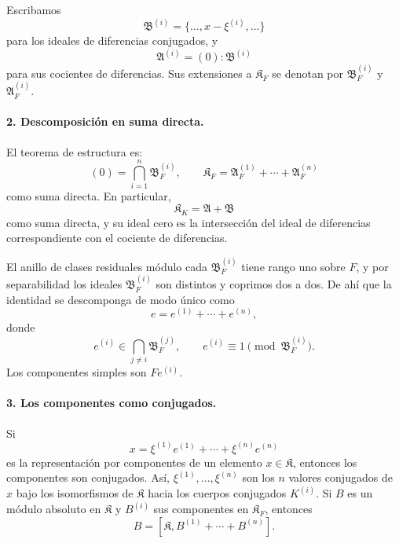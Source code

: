 \documentclass[11pt]{article}
\begin{document}
Escribamos
\[
        \mathfrak B^{(i)}=\{\ldots,x-\xi^{(i)},\ldots\}
\]
para los ideales de diferencias conjugados, y
\[
        \mathfrak A^{(i)}=(0):\mathfrak B^{(i)}
\]
para sus cocientes de diferencias. Sus extensiones a $\mathfrak K_F$ se denotan por $\mathfrak B_F^{(i)}$ y $\mathfrak A_F^{(i)}$.

\paragraph{2. Descomposición en suma directa.}
El teorema de estructura es:
\[
        (0)=\bigcap_{i=1}^n \mathfrak B_F^{(i)},
        \qquad
        \mathfrak K_F=\mathfrak A_F^{(1)}+
        \cdots+\mathfrak A_F^{(n)}
\]
como suma directa. En particular,
\[
        \mathfrak K_K=\mathfrak A+\mathfrak B
\]
como suma directa, y su ideal cero es la intersección del ideal de diferencias correspondiente con el cociente de diferencias.

El anillo de clases residuales módulo cada $\mathfrak B_F^{(i)}$ tiene rango uno sobre $F$, y por separabilidad los ideales $\mathfrak B_F^{(i)}$ son distintos y coprimos dos a dos. De ahí que la identidad se descomponga de modo único como
\[
        e=e^{(1)}+
        \cdots+e^{(n)},
\]
donde
\[
        e^{(i)}\in\bigcap_{j\ne i}\mathfrak B_F^{(j)},
        \qquad
        e^{(i)}\equiv1\pmod {\mathfrak B_F^{(i)}}.
\]
Los componentes simples son $Fe^{(i)}$.

\paragraph{3. Los componentes como conjugados.}
Si
\[
        x=\xi^{(1)}e^{(1)}+
        \cdots+\xi^{(n)}e^{(n)}
\]
es la representación por componentes de un elemento $x\in\mathfrak K$, entonces los componentes son conjugados. Así, $\xi^{(1)},\ldots,\xi^{(n)}$ son los $n$ valores conjugados de $x$ bajo los isomorfismos de $\mathfrak K$ hacia los cuerpos conjugados $K^{(i)}$. Si $B$ es un módulo absoluto en $\mathfrak K$ y $B^{(i)}$ sus componentes en $\mathfrak K_F$, entonces
\[
        B=[\mathfrak K,B^{(1)}+\cdots+B^{(n)}].
\]
\end{document}
